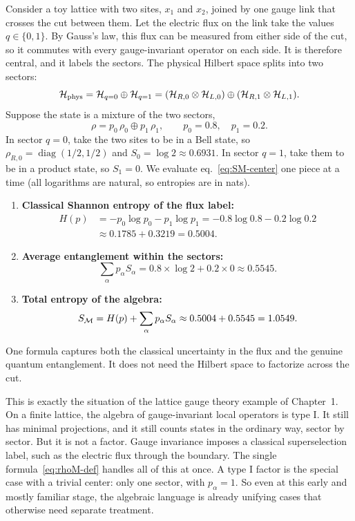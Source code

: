 \begin{workedexamplebox}
Consider a toy lattice with two sites, $x_1$ and $x_2$, joined by one gauge link that crosses the cut between
them. Let the electric flux on the link take the values $q \in \{0, 1\}$. By Gauss's law, this flux can be
measured from either side of the cut, so it commutes with every gauge-invariant operator on each side. It is
therefore central, and it labels the sectors. The physical Hilbert space splits into two sectors:
\[
\mathcal{H}_{\text{phys}} = \mathcal{H}_{q=0} \oplus \mathcal{H}_{q=1}
= (\mathcal{H}_{R,0}\otimes\mathcal{H}_{L,0}) \oplus (\mathcal{H}_{R,1}\otimes\mathcal{H}_{L,1}) .
\]
Suppose the state is a mixture of the two sectors,
\[
\rho = p_0\,\rho_0 \oplus p_1\,\rho_1 , \qquad p_0 = 0.8, \quad p_1 = 0.2 .
\]
In sector $q=0$, take the two sites to be in a Bell state, so $\rho_{R,0} = \operatorname{diag}(1/2, 1/2)$
and $S_0 = \log 2 \approx 0.6931$. In sector $q=1$, take them to be in a product state, so $S_1 = 0$.
We evaluate eq.~\eqref{eq:SM-center} one piece at a time (all logarithms are natural, so entropies are in
nats).
\begin{enumerate}
\item \textbf{Classical Shannon entropy of the flux label:}
\begin{align*}
H(p) &= -p_0\log p_0 - p_1\log p_1 = -0.8\log 0.8 - 0.2\log 0.2 \\
&\approx 0.1785 + 0.3219 = 0.5004 .
\end{align*}
\item \textbf{Average entanglement within the sectors:}
\[
\sum_\alpha p_\alpha S_\alpha = 0.8 \times \log 2 + 0.2 \times 0 \approx 0.5545 .
\]
\item \textbf{Total entropy of the algebra:}
\[
S_{\mathcal{M}} = H(p) + \sum_\alpha p_\alpha S_\alpha \approx 0.5004 + 0.5545 = 1.0549 .
\]
\end{enumerate}
One formula captures both the classical uncertainty in the flux and the genuine quantum entanglement. It does
not need the Hilbert space to factorize across the cut.
\end{workedexamplebox}

This is exactly the situation of the lattice gauge theory example of Chapter~1. On a finite lattice, the algebra
of gauge-invariant local operators is type I. It still has minimal projections, and it still counts states in
the ordinary way, sector by sector. But it is not a factor. Gauge invariance imposes a classical superselection
label, such as the electric flux through the boundary. The single formula~\eqref{eq:rhoM-def} handles all of
this at once. A type I factor is the special case with a trivial center: only one sector, with $p_\alpha=1$.
So even at this early and mostly familiar stage, the algebraic language is already unifying cases that
otherwise need separate treatment.

